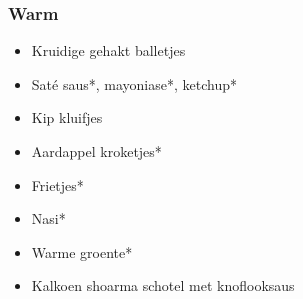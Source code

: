 \subsubsection{Warm}
\begin{itemize}
	\item	Kruidige gehakt balletjes
	\item	Saté saus*, mayoniase*, ketchup*
	\item Kip kluifjes
	\item	Aardappel kroketjes*
	\item	Frietjes*
	\item	Nasi*
	\item	Warme groente*
	\item	Kalkoen shoarma schotel met knoflooksaus
\end{itemize}
